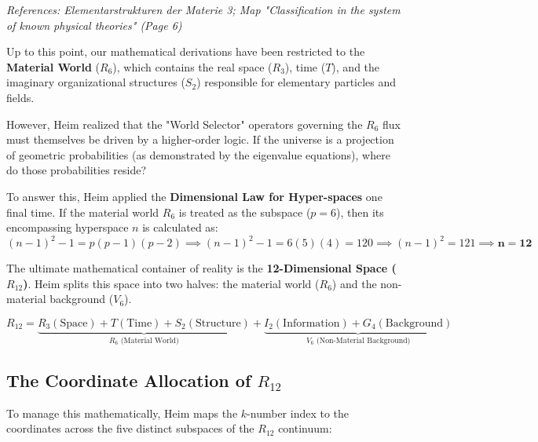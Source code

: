 \documentclass[11pt,a4paper,oneside]{article}
\begin{document}
\textit{References: Elementarstrukturen der Materie 3; Map "Classification in the system of known physical theories" (Page 6)}

Up to this point, our mathematical derivations have been restricted to the \textbf{Material World} ($R_6$), which contains the real space ($R_3$), time ($T$), and the imaginary organizational structures ($S_2$) responsible for elementary particles and fields. 

However, Heim realized that the "World Selector" operators governing the $R_6$ flux must themselves be driven by a higher-order logic. If the universe is a projection of geometric probabilities (as demonstrated by the eigenvalue equations), where do those probabilities reside? 

To answer this, Heim applied the \textbf{Dimensional Law for Hyper-spaces} one final time. If the material world $R_6$ is treated as the subspace ($p=6$), then its encompassing hyperspace $n$ is calculated as:
\begin{equation}
    (n-1)^2 - 1 = p(p-1)(p-2) \implies (n-1)^2 - 1 = 6(5)(4) = 120 \implies (n-1)^2 = 121 \implies \mathbf{n = 12}
\end{equation}

The ultimate mathematical container of reality is the \textbf{12-Dimensional Space ($R_{12}$)}. Heim splits this space into two halves: the material world ($R_6$) and the non-material background ($V_6$).

\begin{equation}
    R_{12} = \underbrace{R_3 (\text{Space}) + T (\text{Time}) + S_2 (\text{Structure})}_{R_6 \text{ (Material World)}} + \underbrace{I_2 (\text{Information}) + G_4 (\text{Background})}_{V_6 \text{ (Non-Material Background)}}
\end{equation}

\subsection{The Coordinate Allocation of \texorpdfstring{$R_{12}$}{R12}}

To manage this mathematically, Heim maps the $k$-number index to the coordinates across the five distinct subspaces of the $R_{12}$ continuum:
\end{document}
